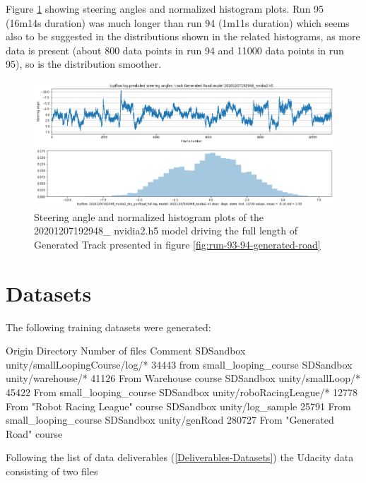 Figure \ref{fig:20201207192948_nvidia2_dry_genRoad_full} showing steering angles and normalized histogram plots. Run 95 (16m14s duration) was much longer than run 94 (1m11s duration) which seems also to be suggested in the distributions shown in the related histograms, as more data is present (about 800 data points in run 94 and 11000 data points in run 95), so is the distribution smoother.
\begin{figure}[ht]
 \centering 
 \includegraphics[width=\textwidth]{Figures/20201207192948_nvidia2_dry_genRoad_full.png}
 \caption{Steering angle and normalized histogram plots of the 20201207192948\_ nvidia2.h5 model driving the full length of Generated Track presented in figure \ref{fig:run-93-94-generated-road} }
 \label{fig:20201207192948_nvidia2_dry_genRoad_full} 
\end{figure}

\section{Datasets}

The following training datasets were generated:

Origin  Directory   Number of files Comment
SDSandbox   unity/smallLoopingCourse/log/* 34443 from small\_looping\_course
SDSandbox   unity/warehouse/*   41126 From Warehouse course
SDSandbox   unity/smallLoop/*   45422   From small\_looping\_course
SDSandbox   unity/roboRacingLeague/* 12778 From "Robot Racing League" course
SDSandbox   unity/log\_sample   25791   From small\_looping\_course
SDSandbox   unity/genRoad 280727 From "Generated Road" course



Following the list of data deliverables (\ref{Deliverables-Datasets}) the Udacity data consisting of two files 



